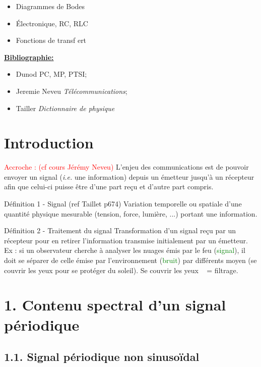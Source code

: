 \documentclass[french, a4paper, 10pt, twocolumn, landscape]{article}
\begin{document}
\begin{itemize}  
\item Diagrammes de Bodes
\item Électronique, RC, RLC
\item Fonctions de transf ert
\end{itemize}
\underline{\textbf{Bibliographie:}}

\begin{itemize}
  \item Dunod PC, MP, PTSI;
  \item Jeremie Neveu \textit{Télécommunications};
  \item Tailler \textit{Dictionnaire de physique}
\end{itemize}
\hrulefill


\section*{Introduction}

\textcolor{red}{Accroche : (cf cours Jérémy Neveu) }L'enjeu des communications est de pouvoir envoyer un signal (\textit{i.e.} une information) depuis un émetteur jusqu'à un récepteur afin que celui-ci puisse être d'une part reçu et d'autre part compris.

\begin{definition}{Définition 1 - Signal}
  (ref Taillet p674) Variation temporelle ou spatiale d'une quantité physique mesurable (tension, force, lumière, ...) portant une information.
\end{definition}

\begin{definition}{Définition 2 - Traitement du signal}
  Transformation d'un signal reçu par un récepteur pour en retirer l'information transmise initialement par un émetteur. Ex : si un observateur cherche à analyser les nuages émis par le feu (\textcolor{green}{signal}), il doit se séparer de celle émise par l'environnement (\textcolor{green}{bruit}) par différents moyen (se couvrir les yeux pour se protéger du soleil). \og Se couvrir les yeux \fg~ = filtrage.
\end{definition}


\section*{1. Contenu spectral d'un signal périodique}

\subsection*{1.1. Signal périodique non sinusoïdal}
\end{document}
